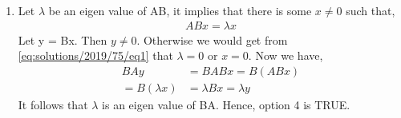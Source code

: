 \begin{enumerate}
    \item Let $\lambda$ be an eigen value of AB, it implies that there is some $x \neq 0$ such that,
    \begin{align}
        ABx = \lambda x \label{eq:solutions/2019/75/eq1}
    \end{align}
    Let y = Bx. Then $y \neq 0$. Otherwise we would get from \eqref{eq:solutions/2019/75/eq1} that $\lambda = 0$ or $x = 0$. Now we have,
    \begin{align}
        BAy &= BABx = B(ABx)  \nonumber \\
         = B(\lambda x) &= \lambda Bx = \lambda y \nonumber
    \end{align}
    It follows that $\lambda$ is an eigen value of BA. Hence, option 4 is TRUE.
\end{enumerate}

